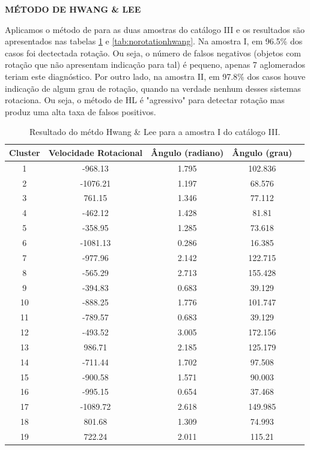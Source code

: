 \textbf{MÉTODO DE HWANG \& LEE}

Aplicamos o método de  para as duas amostras do catálogo III  e os resultados são apresentados nas tabelas \ref{tab:rotationhwang} e \ref{tab:norotationhwang}. Na amostra I, em 96.5\% dos casos foi dectectada rotação. Ou seja, o número
de falsos negativos (objetos com rotação que não apresentam indicação para tal) é pequeno, apenas 7 aglomerados teriam 
este diagnóstico. Por outro lado,
na amostra II, em 97.8\% dos casos houve indicação de algum grau de rotação, quando na verdade nenhum desses
sistemas rotaciona. Ou seja, o método de HL é "agressivo" para detectar rotação mas produz uma alta 
taxa de falsos positivos.

{\scriptsize
\begin{longtable}{ccccc}
\caption{Resultado do métdo Hwang \& Lee para a amostra I do catálogo III.}\label{tab:rotationhwang}
\\ \hline
\multicolumn{1}{l}{\textbf{Cluster}} & \multicolumn{1}{l}{\textbf{Velocidade Rotacional}} & \multicolumn{1}{l}{\textbf{Ângulo (radiano)}} & \multicolumn{1}{l}{\textbf{Ângulo (grau)}} \\ \hline
1 & -968.13 & 1.795 & 102.836 \\
2 & -1076.21 & 1.197 & 68.576 \\
3 & 761.15 & 1.346 & 77.112 \\
4 & -462.12 & 1.428 & 81.81 \\
5 & -358.95 & 1.285 & 73.618 \\
6 & -1081.13 & 0.286 & 16.385 \\
7 & -977.96 & 2.142 & 122.715 \\
8 & -565.29 & 2.713 & 155.428 \\
9 & -394.83 & 0.683 & 39.129 \\
10 & -888.25 & 1.776 & 101.747 \\
11 & -789.57 & 0.683 & 39.129 \\
12 & -493.52 & 3.005 & 172.156 \\
13 & 986.71 & 2.185 & 125.179 \\
14 & -711.44 & 1.702 & 97.508 \\
15 & -900.58 & 1.571 & 90.003 \\
16 & -995.15 & 0.654 & 37.468 \\
17 & -1089.72 & 2.618 & 149.985 \\
18 & 801.68 & 1.309 & 74.993 \\
19 & 722.24 & 2.011 & 115.21 \\

\end{longtable}}
